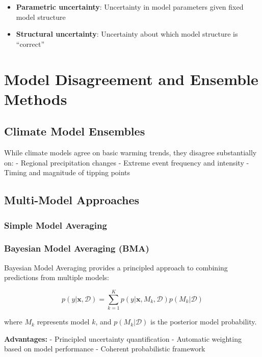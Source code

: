 \documentclass[
  letterpaper,
  DIV=11,
  numbers=noendperiod]{scrreprt}
\providecommand{\tightlist}{%
  \setlength{\itemsep}{0pt}\setlength{\parskip}{0pt}}
\begin{document}
\begin{itemize}
\tightlist
\item
  \textbf{Parametric uncertainty}: Uncertainty in model parameters given
  fixed model structure
\item
  \textbf{Structural uncertainty}: Uncertainty about which model
  structure is ``correct''
\end{itemize}

\section{Model Disagreement and Ensemble
Methods}\label{model-disagreement-and-ensemble-methods}

\subsection{Climate Model Ensembles}\label{climate-model-ensembles}

While climate models agree on basic warming trends, they disagree
substantially on: - Regional precipitation changes - Extreme event
frequency and intensity - Timing and magnitude of tipping points

\subsection{Multi-Model Approaches}\label{multi-model-approaches}

\subsubsection{Simple Model Averaging}\label{simple-model-averaging}

\subsubsection{Bayesian Model Averaging
(BMA)}\label{bayesian-model-averaging-bma}

Bayesian Model Averaging provides a principled approach to combining
predictions from multiple models:

\[
p(y | \mathbf{x}, \mathcal{D}) = \sum_{k=1}^K p(y | \mathbf{x}, M_k, \mathcal{D}) p(M_k | \mathcal{D})
\]

where \(M_k\) represents model \(k\), and \(p(M_k | \mathcal{D})\) is
the posterior model probability.

\textbf{Advantages:} - Principled uncertainty quantification - Automatic
weighting based on model performance - Coherent probabilistic framework
\end{document}
